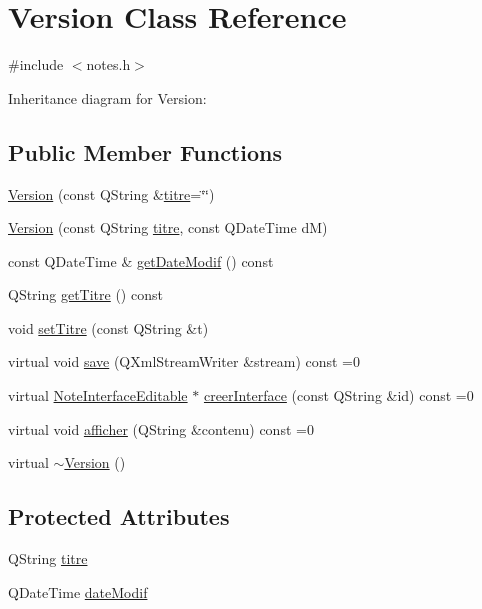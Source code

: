 \hypertarget{classVersion}{}\section{Version Class Reference}
\label{classVersion}


{\ttfamily \#include $<$notes.\+h$>$}



Inheritance diagram for Version\+:
\subsection*{Public Member Functions}
\begin{DoxyCompactItemize}
\item 
\hyperlink{classVersion_ac5b8cbdb89e0ac7ab1d10cad749e2f19}{Version} (const Q\+String \&\hyperlink{classVersion_aca8fa55366506ebef8df8fc91ccf9523}{titre}=\char`\"{}\char`\"{})
\item 
\hyperlink{classVersion_a357278f4341b17f2b24cbdaa9227955c}{Version} (const Q\+String \hyperlink{classVersion_aca8fa55366506ebef8df8fc91ccf9523}{titre}, const Q\+Date\+Time dM)
\item 
const Q\+Date\+Time \& \hyperlink{classVersion_adf8e8ec1339dfc88261e9692808cf460}{get\+Date\+Modif} () const 
\item 
Q\+String \hyperlink{classVersion_a3b597de34a02b2c15c8c42e6abd5a0a5}{get\+Titre} () const 
\item 
void \hyperlink{classVersion_a7efdb586e3b9ddac31ee7ac3820ff9e3}{set\+Titre} (const Q\+String \&t)
\item 
virtual void \hyperlink{classVersion_a65e19272c47be997deff146ab3ba1590}{save} (Q\+Xml\+Stream\+Writer \&stream) const =0
\item 
virtual \hyperlink{classNoteInterfaceEditable}{Note\+Interface\+Editable} $\ast$ \hyperlink{classVersion_abeb05ad12c9777bbac59bcd9037481b1}{creer\+Interface} (const Q\+String \&id) const =0
\item 
virtual void \hyperlink{classVersion_a1974f6753709e04f50a58cbe73c23f31}{afficher} (Q\+String \&contenu) const =0
\item 
virtual \hyperlink{classVersion_af26bb3890de1707d7c044d12447b687a}{$\sim$\+Version} ()
\end{DoxyCompactItemize}
\subsection*{Protected Attributes}
\begin{DoxyCompactItemize}
\item 
Q\+String \hyperlink{classVersion_aca8fa55366506ebef8df8fc91ccf9523}{titre}
\item 
Q\+Date\+Time \hyperlink{classVersion_aaa03eab0aacd55d7b7c96f02cb4c8ff0}{date\+Modif}
\end{DoxyCompactItemize}



